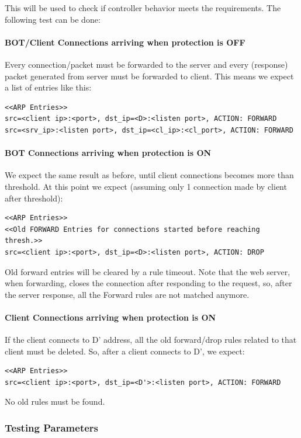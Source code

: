 This will be used to check if controller behavior meets the requirements. The following test can be done:

\paragraph{BOT/Client Connections arriving when protection is OFF}
Every connection/packet must be forwarded to the server and every (response) packet generated from server must be forwarded to client. This means we expect a list of entries like this:
\begin{lstlisting}
<<ARP Entries>>
src=<client ip>:<port>, dst_ip=<D>:<listen port>, ACTION: FORWARD
src=<srv_ip>:<listen port>, dst_ip=<cl_ip>:<cl_port>, ACTION: FORWARD
\end{lstlisting}

\paragraph{BOT Connections arriving when protection is ON}
We expect the same result as before, until client connections becomes more than threshold. At this point we expect (assuming only 1 connection made by client after threshold):
\begin{lstlisting}
<<ARP Entries>>
<<Old FORWARD Entries for connections started before reaching thresh.>>
src=<client ip>:<port>, dst_ip=<D>:<listen port>, ACTION: DROP
\end{lstlisting}
Old forward entries will be cleared by a rule timeout. Note that the web server, when forwarding, closes the connection after responding to the request, so, after the server response, all the Forward rules are not matched anymore.

\paragraph{Client Connections arriving when protection is ON}
If the client connects to D' address, all the old forward/drop rules related to that client must be deleted. So, after a client connects to D', we expect:
\begin{lstlisting}
<<ARP Entries>>
src=<client ip>:<port>, dst_ip=<D'>:<listen port>, ACTION: FORWARD
\end{lstlisting}
No old rules must be found.
\subsubsection{Testing Parameters}

